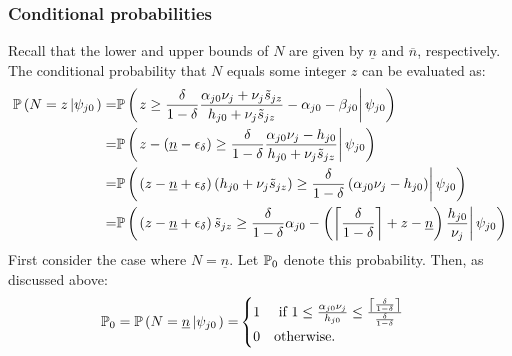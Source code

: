 \documentclass[11 pt]{article}
\newcommand{\pr}[1]{\left( #1 \right)}
\newcommand{\cls}[2]{\left. #1 \right\vert #2}
\newcommand{\crs}[2]{#1 \left\vert #2 \right.}
\newcommand{\pass}{s}
\newcommand{\ddelta}{\left\lceil \frac{\delta}{1 - \delta} \right\rceil}
\newcommand*{\ks}[1][t]{\tilde{\pass}_{j #1}}
\begin{document}
\subsubsection*{Conditional probabilities}

Recall that the lower and upper bounds of $N$ are given by $\underline{n}$ and $\overline{n}$, respectively. 
The conditional probability that $N$ equals some integer $z$ can be evaluated as:
\begin{align}
    \PP \pr{\crs{
        N = z
    }{\psi_{j0}}}
    =&
    \nonumber
    \PP \pr{\cls{
        z 
        \geq 
        \frac{\delta}{1 - \delta}
        \frac{\alpha_{j0} \nu_j + \nu_j \ks[z]}{h_{j0} + \nu_j \ks[z]} -\alpha_{j0} - \beta_{j0}
    }{\psi_{j0}}}
    \\
    \nonumber
    =&
    \PP \pr{\cls{
        z - \pr{\underline{n} - \epsilon_\delta}
        \geq
        \frac{\delta}{1 - \delta}
        \frac{\alpha_{j0} \nu_j - h_{j0}}{h_{j0} + \nu_j \ks[z]}
    }{\psi_{j0}}} 
    \\
    =&
    \PP \pr{\cls{
        \pr{z - \underline{n} + \epsilon_\delta}
        \pr{h_{j0} + \nu_j \ks[z]}
        \geq
        \frac{\delta}{1 - \delta}
        \pr{\alpha_{j0} \nu_j - h_{j0}}
    }{\psi_{j0}}} 
    \\
    =&
    \PP \pr{\cls{
        \pr{z - \underline{n} + \epsilon_\delta}
        \ks[z]
        \geq
        \frac{\delta}{1 - \delta} \alpha_{j0}
        -
        \pr{\ddelta + z - \underline{n}}
        \frac{h_{j0}}{\nu_j}
    }{\psi_{j0}}} 
\end{align}
First consider the case where $N = \underline{n}$. Let $\mathbb{P}_0$ denote this probability. Then, as discussed above:
\begin{align*}
    \PP_0 = \PP \pr{\crs{
        N = \underline{n}
    }{\psi_{j0}}}
    =&
    \begin{cases}
    1 &\text{ if } 1 \leq \frac{\alpha_{j0} \nu_j}{h_{j0}} \leq \frac{\ddelta}{\frac{\delta}{1 - \delta}}
    \\
    0 &\text{otherwise}.
    \end{cases}
\end{align*} 
\end{document}
